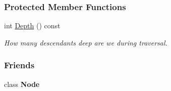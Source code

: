 \subsubsection*{Protected Member Functions}
\begin{DoxyCompactItemize}
\item 
int \hyperlink{classMezzanine_1_1xml_1_1TreeWalker_a24eee99cdf581398a60ee06e11775da4}{Depth} () const 
\begin{DoxyCompactList}\small\item\em How many descendants deep are we during traversal. \item\end{DoxyCompactList}\end{DoxyCompactItemize}
\subsubsection*{Friends}
\begin{DoxyCompactItemize}
\item 
\hypertarget{classMezzanine_1_1xml_1_1TreeWalker_a6db9d28bd448a131448276ee03de1e6d}{
class {\bfseries Node}}
\label{classMezzanine_1_1xml_1_1TreeWalker_a6db9d28bd448a131448276ee03de1e6d}

\end{DoxyCompactItemize}


